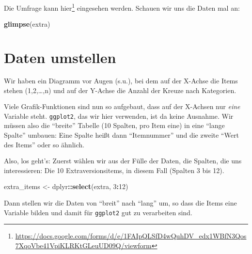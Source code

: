 \documentclass[12pt,ngerman,]{book}
\makeatletter
\newenvironment{Shaded}{\begin{snugshade}}{\end{snugshade}}
\newcommand{\KeywordTok}[1]{\textcolor[rgb]{0.13,0.29,0.53}{\textbf{#1}}}
\newcommand{\DataTypeTok}[1]{\textcolor[rgb]{0.13,0.29,0.53}{#1}}
\newcommand{\DecValTok}[1]{\textcolor[rgb]{0.00,0.00,0.81}{#1}}
\newcommand{\StringTok}[1]{\textcolor[rgb]{0.31,0.60,0.02}{#1}}
\newcommand{\OperatorTok}[1]{\textcolor[rgb]{0.81,0.36,0.00}{\textbf{#1}}}
\newcommand{\NormalTok}[1]{#1}
\let\rmarkdownfootnote\footnote%
\def\footnote{\protect\rmarkdownfootnote}
\newenvironment{kframe}{%
\medskip{}
\setlength{\fboxsep}{.8em}
 \def\at@end@of@kframe{}%
 \ifinner\ifhmode%
  \def\at@end@of@kframe{\end{minipage}}%
  \begin{minipage}{\columnwidth}%
 \fi\fi%
 \def\FrameCommand##1{\hskip\@totalleftmargin \hskip-\fboxsep
 \colorbox{shadecolor}{##1}\hskip-\fboxsep
     \hskip-\linewidth \hskip-\@totalleftmargin \hskip\columnwidth}%
 \MakeFramed {\advance\hsize-\width
   \@totalleftmargin\z@ \linewidth\hsize
   \@setminipage}}%
 {\par\unskip\endMakeFramed%
 \at@end@of@kframe}
\renewenvironment{Shaded}{\begin{kframe}}{\end{kframe}}
\theoremstyle{definition}
\theoremstyle{definition}
\theoremstyle{remark}
\makeatother
\begin{document}
Die Umfrage kann hier\footnote{\url{https://docs.google.com/forms/d/e/1FAIpQLSfD4wQuhDV_edx1WBfN3Qos7XqoVbe41VpiKLRKtGLeuUD09Q/viewform}}
eingesehen werden. Schauen wir uns die Daten mal an:

\begin{Shaded}
\begin{Highlighting}[]
\KeywordTok{glimpse}\NormalTok{(extra)}
\end{Highlighting}
\end{Shaded}

\section{Daten umstellen}\label{daten-umstellen}

Wir haben ein Diagramm vor Augen (s.u.), bei dem auf der X-Achse die
Items stehen (1,2,\ldots{},n) und auf der Y-Achse die Anzahl der Kreuze
nach Kategorien.

Viele Grafik-Funktionen sind nun so aufgebaut, dass auf der X-Achsen nur
\emph{eine} Variable steht. \texttt{ggplot2}, das wir hier verwenden,
ist da keine Ausnahme. Wir müssen also die ``breite'' Tabelle (10
Spalten, pro Item eine) in eine ``lange Spalte'' umbauen: Eine Spalte
heißt dann ``Itemnummer'' und die zweite ``Wert des Items'' oder so
ähnlich.

Also, los geht's: Zuerst wählen wir aus der Fülle der Daten, die
Spalten, die uns interessieren: Die 10 Extraversionsitems, in diesem
Fall (Spalten 3 bis 12).

\begin{Shaded}
\begin{Highlighting}[]
\NormalTok{extra_items <-}\StringTok{ }\NormalTok{dplyr}\OperatorTok{::}\KeywordTok{select}\NormalTok{(extra, }\DecValTok{3}\OperatorTok{:}\DecValTok{12}\NormalTok{)}
\end{Highlighting}
\end{Shaded}

Dann stellen wir die Daten von ``breit'' nach ``lang'' um, so dass die
Items eine Variable bilden und damit für \texttt{ggplot2} gut zu
verarbeiten sind.

\begin{Shaded}
\end{Shaded}
\end{document}
